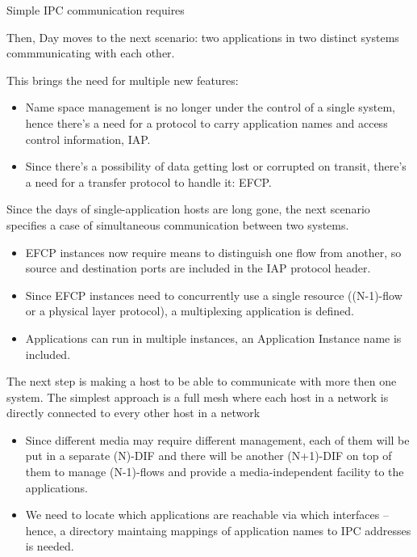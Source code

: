             \vspace{300pt}
            Simple IPC communication requires

            Then, Day moves to the next scenario: two applications in two distinct systems commmunicating with each other.

            This brings the need for multiple new features:

            \begin{itemize}
            \item Name space management is no longer under the control of a single system, hence there's a need for a protocol to carry application names and access control information, IAP.
            \item Since there's a possibility of data getting lost or corrupted on transit, there's a need for a transfer protocol to handle it: EFCP.
            \end{itemize}

            Since the days of single-application hosts are long gone, the next scenario specifies a case of simultaneous communication between two systems.
            \vspace{300pt}
            \begin{itemize}
            \item EFCP instances now require means to distinguish one flow from another, so source and destination ports are included in the IAP protocol header.
            \item Since EFCP instances need to concurrently use a single resource ((N-1)-flow or a physical layer protocol), a multiplexing application is defined.
            \item Applications can run in multiple instances, an Application Instance name is included.
            \end{itemize}

            The next step is making a host to be able to communicate with more then one system. The simplest approach is a full mesh where each host in a network is directly connected to every other host in a network
            \vspace{300pt}
            \begin{itemize}
            \item Since different media may require different management, each of them will be put in a separate (N)-DIF and there will be another (N+1)-DIF on top of them to manage (N-1)-flows and provide a media-independent facility to the applications.
            \item We need to locate which applications are reachable via which interfaces -- hence, a directory maintaing mappings of application names to IPC addresses is needed.
            \end{itemize}

